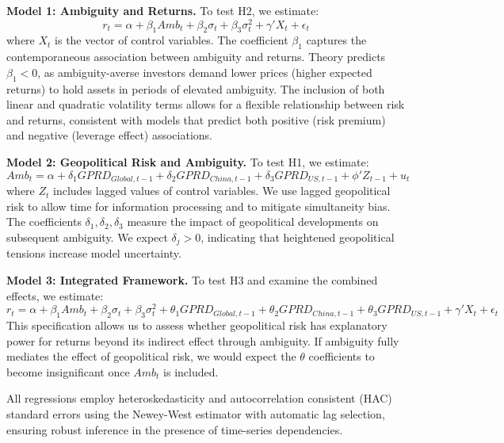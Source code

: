 \documentclass[preprint,12pt,authoryear]{elsarticle}
\begin{document}
\textbf{Model 1: Ambiguity and Returns.} To test H2, we estimate:
\begin{equation}
r_t = \alpha + \beta_1 Amb_t + \beta_2 \sigma_t + \beta_3 \sigma_t^2 + \gamma' X_t + \epsilon_t
\end{equation}
where $X_t$ is the vector of control variables. The coefficient $\beta_1$ captures the contemporaneous association between ambiguity and returns. Theory predicts $\beta_1 < 0$, as ambiguity-averse investors demand lower prices (higher expected returns) to hold assets in periods of elevated ambiguity. The inclusion of both linear and quadratic volatility terms allows for a flexible relationship between risk and returns, consistent with models that predict both positive (risk premium) and negative (leverage effect) associations.

\textbf{Model 2: Geopolitical Risk and Ambiguity.} To test H1, we estimate:
\begin{equation}
Amb_t = \alpha + \delta_1 GPRD_{Global,t-1} + \delta_2 GPRD_{China,t-1} + \delta_3 GPRD_{US,t-1} + \phi' Z_{t-1} + u_t
\end{equation}
where $Z_t$ includes lagged values of control variables. We use lagged geopolitical risk to allow time for information processing and to mitigate simultaneity bias. The coefficients $\delta_1, \delta_2, \delta_3$ measure the impact of geopolitical developments on subsequent ambiguity. We expect $\delta_j > 0$, indicating that heightened geopolitical tensions increase model uncertainty.

\textbf{Model 3: Integrated Framework.} To test H3 and examine the combined effects, we estimate:
\begin{equation}
r_t = \alpha + \beta_1 Amb_t + \beta_2 \sigma_t + \beta_3 \sigma_t^2 + \theta_1 GPRD_{Global,t-1} + \theta_2 GPRD_{China,t-1} + \theta_3 GPRD_{US,t-1} + \gamma' X_t + \epsilon_t
\end{equation}
This specification allows us to assess whether geopolitical risk has explanatory power for returns beyond its indirect effect through ambiguity. If ambiguity fully mediates the effect of geopolitical risk, we would expect the $\theta$ coefficients to become insignificant once $Amb_t$ is included.

All regressions employ heteroskedasticity and autocorrelation consistent (HAC) standard errors using the Newey-West estimator with automatic lag selection, ensuring robust inference in the presence of time-series dependencies.
\end{document}
